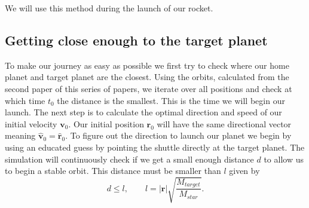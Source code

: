 \documentclass[reprint,english,notitlepage]{revtex4-2}
\begin{document}
We will use this method during the launch of our rocket.

\subsection{Getting close enough to the target planet}\label{subsec:getting-close-enough}
To make our journey as easy as possible we first try to check where our home planet and target planet are the closest.
Using the orbits, calculated from the second paper %
of this series of papers, we iterate over all positions and check at which time $ t_{0} $ the distance is the smallest.
This is the time we will begin our launch.
The next step is to calculate the optimal direction and speed of our initial velocity $ \mathbf{v}_0 $.
Our initial position $ \mathbf{r}_0 $ will have the same directional vector meaning $ \hat{\mathbf{v}}_0 = \hat{\mathbf{r}}_0  $.
To figure out the direction to launch our planet we begin by using an educated guess by pointing the shuttle directly at the target planet.
The simulation will continuously check if we get a small enough distance $ d $ to allow us to begin a stable orbit.
This distance must be smaller than $ l $ given by
\[
d \le l, \qquad l = \left\vert \mathbf{r} \right\vert \sqrt{\frac{M_{target}}{M_{star}}}.
\]
\end{document}
